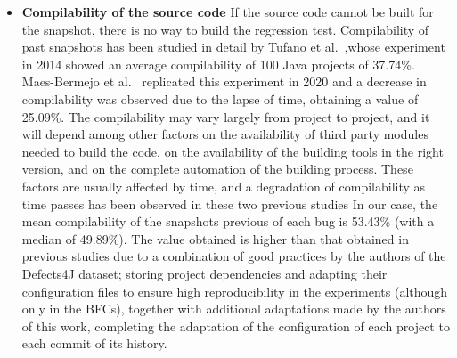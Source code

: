 \begin{itemize}
\item \textbf{Compilability of the source code} If the source code cannot be built for the snapshot, there is no way to build the regression test. 
Compilability of past snapshots has been studied in detail by Tufano et al.~\cite{tufano2017there},whose experiment in 2014 showed an average compilability of 100 Java projects of 37.74\%. Maes-Bermejo et al.~\cite{maes2022revisiting} replicated this experiment in 2020 and a decrease in compilability was observed due to the lapse of time, 
obtaining a value of 25.09\%. The compilability may vary largely from project to project, and it will depend among other factors on the availability of third party modules needed to build the code, on the availability of the building tools in the right version, and on the complete automation of the building process. These factors are usually affected by time, and a degradation of compilability as time passes has been observed in these two previous studies
In our case, the mean compilability of the snapshots previous of each bug is 53.43\% (with a median of 49.89\%). 
The value obtained is higher than that obtained in previous studies due to a combination of good practices by the authors of the Defects4J dataset; 
storing project dependencies and adapting their configuration files to ensure high reproducibility in the experiments (although only in the BFCs), together with additional adaptations made by the authors of this work, completing the adaptation of the configuration of each project to each commit of its history.

\end{itemize}
